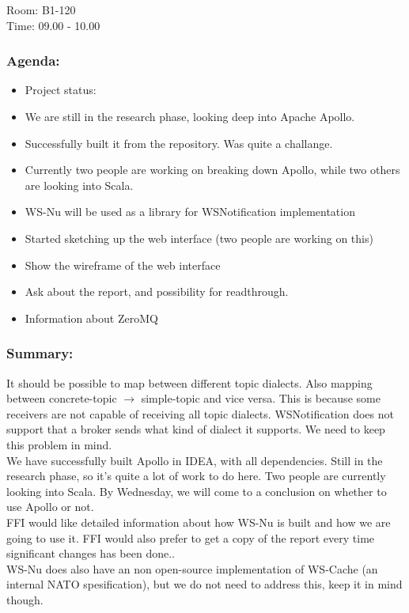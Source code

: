 Room: B1-120 \\
\noindent Time: 09.00 - 10.00

\subsubsection*{Agenda:}
\begin{itemize}
\setlength{\itemsep}{0cm}%
\item Project status:
\item We are still in the research phase, looking deep into Apache Apollo.
\item Successfully built it from the repository. Was quite a challange. 
\item Currently two people are working on breaking down Apollo, while two others are looking into Scala. 
\item WS-Nu will be used as a library for WSNotification implementation
\item Started sketching up the web interface (two people are working on this)
\item Show the wireframe of the web interface
\item Ask about the report, and possibility for readthrough. 
\item Information about ZeroMQ
\end{itemize}

\subsubsection*{Summary:} 
It should be possible to map between different topic dialects. Also mapping between concrete-topic $\rightarrow$ simple-topic and vice versa. This is because some receivers are not capable of receiving all topic dialects. WSNotification does not support that a broker sends what kind of dialect it supports. We need to keep this problem in mind. \\

\noindent We have successfully built Apollo in IDEA, with all dependencies. Still in the research phase, so it’s quite a lot of work to do here. Two people are currently looking into Scala. By Wednesday, we will come to a conclusion on whether to use Apollo or not. \\

\noindent FFI would like detailed information about how WS-Nu is built and how we are going to use it. FFI would also prefer to get a copy of the report every time significant changes has been done.. \\


\noindent WS-Nu does also have an non open-source implementation of WS-Cache (an internal NATO spesification),  but we do not need to address this, keep it in mind though. \\

\clearpage